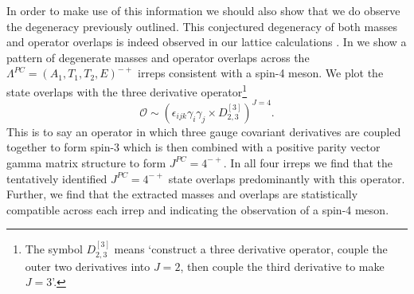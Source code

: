 In order to make use of this information we should also show that we do observe the degeneracy previously outlined. This conjectured degeneracy of both masses and operator overlaps is indeed observed in our lattice calculations \cite{Dudek:2010wm,Dudek:2009qf}.  In  we show a pattern of  degenerate masses and operator overlaps across the $\Lambda^{PC} = (A_1,T_1,T_2,E)^{-+}$ irreps consistent with a spin-4 meson. We plot the state overlaps with the three derivative operator\footnote{The symbol  $D^{[3]}_{2,3}$ means `construct a three derivative operator, couple the outer two derivatives into $J=2$, then couple the third derivative to make $J=3$'.}
\begin{equation*}
\mathcal{O} \sim  (\epsilon_{ijk} \gamma_i\gamma_j \times D^{[3]}_{2,3})^{J=4} .
\end{equation*}
This is to say an operator in which three gauge covariant derivatives are coupled together to form spin-3 which is then combined with a positive parity vector gamma matrix structure to form $J^{PC} = 4^{-+}$. In all four irreps we find that the tentatively identified $J^{PC}=4^{-+}$ state overlaps predominantly with this operator. Further, we find that the extracted masses and overlaps are statistically compatible across each irrep and indicating the observation of a spin-4 meson. 


